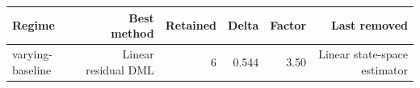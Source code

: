\begin{tabular}{lrrrrr}
\toprule
Regime & Best method & Retained & Delta & Factor & Last removed \\
\midrule
varying-baseline & Linear residual DML & 6 & 0.544 & 3.50 & Linear state-space estimator \\
\bottomrule
\end{tabular}
